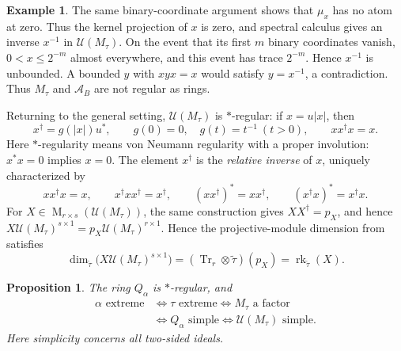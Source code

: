 \documentclass[11pt]{amsart}
\DeclareMathOperator{\rk}{rk}
\DeclareMathOperator{\Mat}{M}
\newtheorem{proposition}[theorem]{Proposition}
\theoremstyle{definition}
\newtheorem{example}[theorem]{Example}
\theoremstyle{remark}
\begin{document}
\begin{example}
The same binary-coordinate argument shows that $\mu_x$ has no atom
at zero.  Thus the kernel projection of $x$ is zero, and spectral
calculus gives an inverse $x^{-1}$ in $\mathcal U(M_\tau)$.
On the event that its first $m$ binary coordinates vanish,
$0<x\leq2^{-m}$ almost everywhere, and this event has trace $2^{-m}$.
Hence $x^{-1}$ is unbounded.  A bounded $y$ with $xyx=x$ would satisfy
$y=x^{-1}$, a contradiction.  Thus $M_\tau$ and $\mathcal A_B$ are
not regular as rings.
\end{example}

Returning to the general setting, $\mathcal U(M_\tau)$ is
$*$-regular: if $x=u|x|$, then
\[
 x^\dagger=g(|x|)u^*,\qquad
 g(0)=0,\quad g(t)=t^{-1}\ (t>0),\qquad xx^\dagger x=x.
\]
Here $*$-regularity means von Neumann regularity with a proper
involution: $x^*x=0$ implies $x=0$.
The element $x^\dagger$ is the \emph{relative inverse} of $x$,
uniquely characterized by
\[
 xx^\dagger x=x,\qquad x^\dagger xx^\dagger=x^\dagger,
 \qquad (xx^\dagger)^*=xx^\dagger,\qquad
 (x^\dagger x)^*=x^\dagger x.
\]
For $X\in\Mat_{r\times s}(\mathcal U(M_\tau))$, the same construction
gives $XX^\dagger=p_X$, and hence
$X\mathcal U(M_\tau)^{s\times1}=p_X\mathcal U(M_\tau)^{r\times1}$.
Hence the projective-module dimension from
 satisfies
\begin{equation}\label{eq:affiliated-rank-dimension}
 \dim_{\widetilde\tau}\bigl(X\mathcal U(M_\tau)^{s\times1}\bigr)
 =(\operatorname{Tr}_r\otimes\widetilde\tau)(p_X)=\rk_{\widetilde\tau}(X).
\end{equation}

\begin{proposition}\label{prop:regular-simple-comparison}
The ring $Q_\alpha$ is $*$-regular, and
\[
 \begin{aligned}
 \alpha\text{ extreme}
 &\iff\tau\text{ extreme}\iff M_\tau\text{ a factor}\\
 &\iff Q_\alpha\text{ simple}
 \iff\mathcal U(M_\tau)\text{ simple}.
 \end{aligned}
\]
Here simplicity concerns all two-sided ideals.
\end{proposition}
\end{document}
